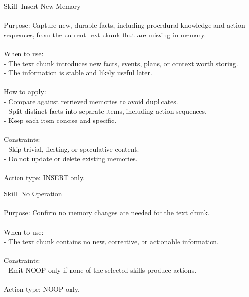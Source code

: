 \begin{center}
\begin{tcolorbox}[
  title={Evolved Skill on ALFWorld - INSERT},
  colback=orange!6,
  colframe=orange!75!black,
  coltitle=black
]
{
Skill: Insert New Memory \\\\
Purpose: Capture new, durable facts, including procedural knowledge and action sequences, from the current text chunk that are missing in memory. \\\\
When to use: \\
- The text chunk introduces new facts, events, plans, or context worth storing. \\
- The information is stable and likely useful later. \\\\
How to apply: \\
- Compare against retrieved memories to avoid duplicates. \\
- Split distinct facts into separate items, including action sequences. \\
- Keep each item concise and specific. \\\\
Constraints: \\
- Skip trivial, fleeting, or speculative content. \\
- Do not update or delete existing memories. \\\\
Action type: INSERT only.
}
\label{appendix:case_insert}
\end{tcolorbox}
\end{center}

\begin{center}
\begin{tcolorbox}[
  title={Evolved Skill on ALFWorld - NOOP},
  colback=orange!6,
  colframe=orange!75!black,
  coltitle=black
]
{
Skill: No Operation \\\\
Purpose: Confirm no memory changes are needed for the text chunk. \\\\
When to use: \\
- The text chunk contains no new, corrective, or actionable information. \\\\
Constraints: \\
- Emit NOOP only if none of the selected skills produce actions. \\\\
Action type: NOOP only.
}
\label{appendix:case_noop}
\end{tcolorbox}
\end{center}

